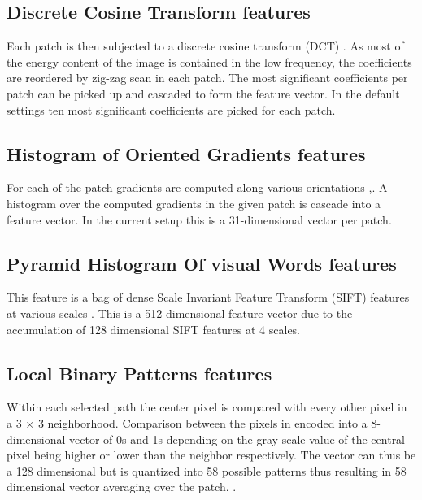 \documentclass[runningheads]{llncs}
\begin{document}
\subsection{Discrete Cosine Transform features}
\label{ssec:dctf}
Each patch is then subjected to a discrete cosine transform (DCT)  \cite{ANR74}. As most of the energy content of the image is contained in the low frequency, the coefficients are reordered by zig-zag scan in each patch. The most significant coefficients per patch can be picked up and cascaded to form the feature vector. In the default settings ten most significant coefficients are picked for each patch.

\subsection{Histogram of Oriented Gradients features}
\label{ssec:hog}
For each of the patch gradients are computed along various orientations \cite{DT05},\cite{FGMR09}. A histogram over the computed gradients in the given patch is cascade into a feature vector. In the current setup this is a 31-dimensional vector per patch.

\subsection{Pyramid Histogram Of visual Words features}
\label{ssec:phow}
This feature is a bag of dense Scale Invariant Feature Transform (SIFT) features at various scales \cite{Bosch07a}. This is a 512 dimensional feature vector due to the accumulation of 128 dimensional SIFT features at 4 scales.

\subsection{Local Binary Patterns features}
\label{ssec:lbp}
Within each selected path the center pixel is compared with every other pixel in a 3 $\times$ 3 neighborhood. Comparison between the pixels in encoded into a 8-dimensional vector of 0s and 1s depending on the gray scale value of the central pixel being higher or lower than the neighbor respectively. The vector can thus be a 128 dimensional but is quantized into 58 possible patterns thus resulting in 58 dimensional vector averaging over the patch. \cite{OPH94}.
\end{document}
